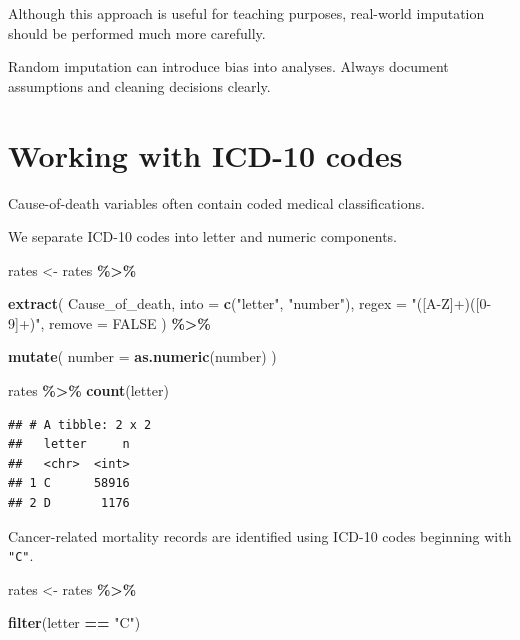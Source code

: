 \documentclass[
  11pt,
  oneside]{book}
\newenvironment{Shaded}{\begin{snugshade}}{\end{snugshade}}
\newcommand{\AttributeTok}[1]{\textcolor[rgb]{0.13,0.29,0.53}{#1}}
\newcommand{\ConstantTok}[1]{\textcolor[rgb]{0.56,0.35,0.01}{#1}}
\newcommand{\FunctionTok}[1]{\textcolor[rgb]{0.13,0.29,0.53}{\textbf{#1}}}
\newcommand{\NormalTok}[1]{#1}
\newcommand{\OtherTok}[1]{\textcolor[rgb]{0.56,0.35,0.01}{#1}}
\newcommand{\SpecialCharTok}[1]{\textcolor[rgb]{0.81,0.36,0.00}{\textbf{#1}}}
\newcommand{\StringTok}[1]{\textcolor[rgb]{0.31,0.60,0.02}{#1}}
\begin{document}
Although this approach is useful for teaching purposes, real-world imputation should be performed much more carefully.

Random imputation can introduce bias into analyses. Always document assumptions and cleaning decisions clearly.

\section{Working with ICD-10 codes}\label{working-with-icd-10-codes}

Cause-of-death variables often contain coded medical classifications.

We separate ICD-10 codes into letter and numeric components.

\begin{Shaded}
\begin{Highlighting}[]
\NormalTok{rates }\OtherTok{\textless{}{-}}\NormalTok{ rates }\SpecialCharTok{\%\textgreater{}\%}
  
  \FunctionTok{extract}\NormalTok{(}
\NormalTok{    Cause\_of\_death,}
    \AttributeTok{into =} \FunctionTok{c}\NormalTok{(}\StringTok{"letter"}\NormalTok{, }\StringTok{"number"}\NormalTok{),}
    \AttributeTok{regex =} \StringTok{"([A{-}Z]+)([0{-}9]+)"}\NormalTok{,}
    \AttributeTok{remove =} \ConstantTok{FALSE}
\NormalTok{  ) }\SpecialCharTok{\%\textgreater{}\%}
  
  \FunctionTok{mutate}\NormalTok{(}
    \AttributeTok{number =} \FunctionTok{as.numeric}\NormalTok{(number)}
\NormalTok{  )}

\NormalTok{rates }\SpecialCharTok{\%\textgreater{}\%}
  \FunctionTok{count}\NormalTok{(letter)}
\end{Highlighting}
\end{Shaded}

\begin{verbatim}
## # A tibble: 2 x 2
##   letter     n
##   <chr>  <int>
## 1 C      58916
## 2 D       1176
\end{verbatim}

Cancer-related mortality records are identified using ICD-10 codes beginning with \texttt{"C"}.

\begin{Shaded}
\begin{Highlighting}[]
\NormalTok{rates }\OtherTok{\textless{}{-}}\NormalTok{ rates }\SpecialCharTok{\%\textgreater{}\%}
  
  \FunctionTok{filter}\NormalTok{(letter }\SpecialCharTok{==} \StringTok{"C"}\NormalTok{)}
\end{Highlighting}
\end{Shaded}
\end{document}
